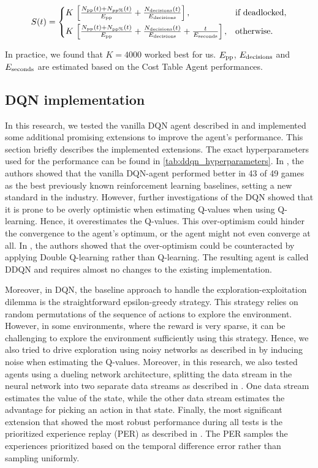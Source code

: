 \documentclass[sn-mathphys]{sn-jnl}
\begin{document}
\begin{equation}
S(t) =\begin{cases} 
K \, \left[ \frac{N_{\rm pp}(t) + N_{pp\%}(t)}{E_{\rm pp}} + \frac{N_{\rm decisions}(t)}{ E_{\rm decisions}}\right], & \text{if deadlocked},\\[6pt]
K \, \left[\frac{N_{\rm pp}(t) + N_{\rm pp\%}(t)}{E_{\rm pp}} + \frac{N_{\rm decisions}(t)}{E_{\rm decisions}} + \frac{t}{E_{\rm seconds}} \right], & \text{otherwise}.
\end{cases}
\end{equation}


In practice, we found that $K=4000$ worked best for us. $E_{\rm pp}$, $E_{\rm decisions}$ and $E_{\rm seconds}$ are estimated based on the Cost Table Agent performances.

\subsection{DQN implementation}

In this research, we tested the vanilla DQN agent described in \cite{Mnih} and implemented some additional promising extensions to improve the agent's performance. This section briefly describes the implemented extensions. The exact hyperparameters used for the performance can be found in \ref{tab:ddqn_hyperparameters}. In \cite{Mnih}, the authors showed that the vanilla DQN-agent performed better in 43 of 49 games as the best previously known reinforcement learning baselines, setting a new standard in the industry. However, further investigations of the DQN showed that it is prone to be overly optimistic when estimating Q-values when using Q-learning. Hence, it overestimates the Q-values. This over-optimism could hinder the convergence to the agent's optimum, or the agent might not even converge at all. In \cite{HasseltGS15}, the authors showed that the over-optimism could be counteracted by applying Double Q-learning rather than Q-learning. The resulting agent is called DDQN and requires almost no changes to the existing implementation.

Moreover, in DQN, the baseline approach to handle the exploration-exploitation dilemma is the straightforward epsilon-greedy strategy. This strategy relies on random permutations of the sequence of actions to explore the environment. However, in some environments, where the reward is very sparse, it can be challenging to explore the environment sufficiently using this strategy. Hence, we also tried to drive exploration using noisy networks as described in \cite{APMOGM17} by inducing noise when estimating the Q-values. Moreover, in this research, we also tested agents using a dueling network architecture, splitting the data stream in the neural network into two separate data streams as described in \cite{WangFL15}. One data stream estimates the value of the state, while the other data stream estimates the advantage for picking an action in that state. Finally, the most significant extension that showed the most robust performance during all tests is the prioritized experience replay (PER) as described in \cite{schaul2015prioritized}. The PER samples the experiences prioritized based on the temporal difference error rather than sampling uniformly.
\end{document}
